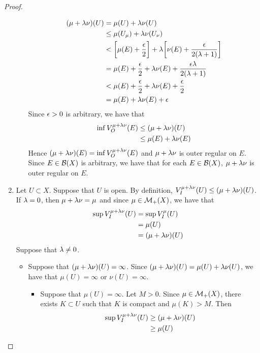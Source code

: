 \documentclass{book}
\begin{document}
\begin{proof}
\begin{enumerate}
\begin{itemize}
				\begin{align*}
					(\mu + \lambda \nu)(U)
					& = \mu(U) + \lambda \nu(U) \\
					& \leq \mu(U_{\mu}) + \lambda \nu(U_{\nu}) \\
					& < \bigg[ \mu(E) + \frac{\epsilon}{2} \bigg] + \lambda \bigg[ \nu(E) + \frac{\epsilon}{2(\lambda + 1)} \bigg] \\
					& = \mu(E) + \frac{\epsilon}{2} + \lambda \nu(E) + \frac{\epsilon \lambda }{2 (\lambda + 1)} \\
					& < \mu(E) + \frac{\epsilon}{2} + \lambda \nu(E) + \frac{\epsilon}{2} \\ 
					& = \mu(E) + \lambda \nu(E) + \epsilon 
				\end{align*}
				Since $\epsilon > 0$ is arbitrary, we have that 
				\begin{align*}
					\inf V_O^{\mu + \lambda \nu}(E)
					& \leq (\mu + \lambda \nu)(U) \\
					& \leq \mu(E) + \lambda \nu(E) 
				\end{align*}
				Hence $(\mu + \lambda \nu)(E) = \inf V^{\mu + \lambda \nu}_O(E)$ and $\mu + \lambda \nu$ is outer regular on $E$. Since $E \in \mathcal{B}(X)$ is arbitrary, we have that for each $E \in \mathcal{B}(X)$, $\mu + \lambda \nu$ is outer regular on $E$.
			\end{itemize}
			\item Let $U \subset X$. Suppose that $U$ is open. By definition, $V_I^{\mu + \lambda \nu}(U) \leq (\mu + \lambda \nu)(U)$. If $\lambda = 0$, then $\mu + \lambda \nu = \mu$ and since $\mu \in \mathcal{M}_+(X)$, we have that
			\begin{align*}
				\sup V_I^{\mu + \lambda \nu}(U)
				& = \sup V_I^{\mu}(U) \\
				& = \mu(U) \\
				& = (\mu + \lambda \nu)(U)
			\end{align*}
			Suppose that $\lambda \neq 0$. 
			\begin{itemize}
				\item Suppose that $(\mu + \lambda \nu)(U) = \infty$. Since $(\mu + \lambda \nu)(U) = \mu(U) + \lambda \nu(U)$, we have that $\mu(U) = \infty$ or $\nu(U) = \infty$. 
				\begin{itemize}
					\item Suppose that $\mu(U) = \infty$. Let $M > 0$. Since $\mu \in \mathcal{M}_+(X)$, there exists $K \subset U$ such that $K$ is compact and $\mu(K) > M$. Then 
					\begin{align*}
						\sup V_I^{\mu + \lam \nu}(U)
						& \geq (\mu + \lam \nu)(U) \\
						& \geq \mu(U) \\

\end{align*}
\end{itemize}
\end{itemize}
\end{enumerate}
\end{proof}
\end{document}
